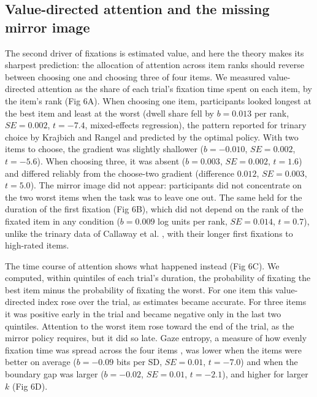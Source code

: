 \documentclass[10pt,letterpaper]{article}
\begin{document}
\subsection*{Value-directed attention and the missing mirror
image}\label{value-directed-attention-and-the-missing-mirror-image}

The second driver of fixations is estimated value, and here the theory
makes its sharpest prediction: the allocation of attention across item
ranks should reverse between choosing one and choosing three of four
items. We measured value-directed attention as the share of each trial's
fixation time spent on each item, by the item's rank (Fig 6A). When
choosing one item, participants looked longest at the best item and
least at the worst (dwell share fell by \(b = 0.013\) per rank,
\(SE = 0.002\), \(t = -7.4\), mixed-effects regression), the pattern
reported for trinary choice by Krajbich and Rangel \cite{krajbich2011}
and predicted by the optimal policy. With two items to choose, the
gradient was slightly shallower (\(b = -0.010\), \(SE = 0.002\),
\(t = -5.6\)). When choosing three, it was absent (\(b = 0.003\),
\(SE = 0.002\), \(t = 1.6\)) and differed reliably from the choose-two
gradient (difference \(0.012\), \(SE = 0.003\), \(t = 5.0\)). The mirror
image did not appear: participants did not concentrate on the two worst
items when the task was to leave one out. The same held for the duration
of the first fixation (Fig 6B), which did not depend on the rank of the
fixated item in any condition (\(b = 0.009\) log units per rank,
\(SE = 0.014\), \(t = 0.7\)), unlike the trinary data of Callaway et al.
\cite{callaway2021}, with their longer first fixations to high-rated
items.

The time course of attention shows what happened instead (Fig 6C). We
computed, within quintiles of each trial's duration, the probability of
fixating the best item minus the probability of fixating the worst. For
one item this value-directed index rose over the trial, as estimates
became accurate. For three items it was positive early in the trial and
became negative only in the last two quintiles. Attention to the worst
item rose toward the end of the trial, as the mirror policy requires,
but it did so late. Gaze entropy, a measure of how evenly fixation time
was spread across the four items \cite{fromer2026}, was lower when the
items were better on average (\(b = -0.09\) bits per SD, \(SE = 0.01\),
\(t = -7.0\)) and when the boundary gap was larger (\(b = -0.02\),
\(SE = 0.01\), \(t = -2.1\)), and higher for larger \(k\) (Fig 6D).
\end{document}
